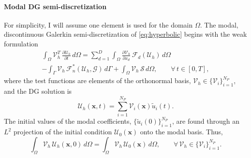 \documentclass[pdflatex,sn-mathphys-num]{sn-jnl}%
\theoremstyle{thmstyleone}%
\theoremstyle{thmstyletwo}%
\theoremstyle{thmstylethree}%
\newcommand{\fnc}[1]{\ensuremath{\mathcal{#1}}}
\begin{document}
\paragraph{Modal DG semi-discretization}

For simplicity, I will assume one element is used for the domain $\Omega$.  The modal, discontinuous Galerkin semi-discretization of \eqref{eq:hyperbolic} begins with the weak formulation
\begin{multline}\label{eq:dg_weak}
    \int_{\Omega} \fnc{V}_h^T \, \frac{\partial \fnc{U}_h}{\partial t} \, d\Omega 
    = \sum_{d=1}^{D} \int_{\Omega} \frac{\partial \fnc{V}_h}{\partial x_d} \, \fnc{F}_d(\fnc{U}_h) \, d\Omega \\ - \int_{\Gamma} \fnc{V}_h \, \fnc{F}_n^*(\fnc{U}_h, \fnc{G}) \, d \Gamma + \int_{\Omega} \fnc{V}_h \, \fnc{S} \, d\Omega,
    \qquad \forall\, t \in [0,T],
\end{multline}
where the test functions are elements of the orthonormal basis, $\fnc{V}_h \in \{\fnc{V}_i \}_{i=1}^{N_P}$, and the DG solution is 
\begin{equation*}
\fnc{U}_h(\bm{x},t) = \sum_{i=1}^{N_P} \fnc{V}_{i}(\bm{x}) \tilde{u}_{i}(t).
\end{equation*}
The initial values of the modal coefficients, $\{ \tilde{u}_i(0) \}_{i=1}^{N_P}$, are found through an $L^2$ projection of the initial condition $\fnc{U}_{0}(\bm{x})$ onto the modal basis.  Thus,
\begin{equation}\label{eq:dg_ic_integral}
    \int_{\Omega} \fnc{V}_h \, \fnc{U}_h(\bm{x},0) \, d\Omega = \int_{\Omega} \fnc{V}_h \, \fnc{U}_0(\bm{x}) \, d\Omega, \qquad \forall\, \fnc{V}_h \in \{ \fnc{V}_{i} \}_{i=1}^{N_P}.
\end{equation}
\end{document}
